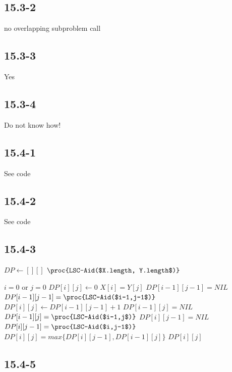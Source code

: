 \documentclass[]{article}
\begin{document}
\subsection{15.3-2}
no overlapping subproblem call

\subsection{15.3-3}
Yes

\subsection{15.3-4}
Do not know how!

\subsection{15.4-1}
See code

\subsection{15.4-2}
See code

\subsection{15.4-3}
\begin{codebox}
	\li $DP \leftarrow [][]$
	\li \Return $\proc{LSC-Aid($X.length, Y.length$)}$
	
\end{codebox}

\begin{codebox}
	\li \If $i = 0$ or $j = 0$ 
	\li \Then $DP[i][j] \leftarrow 0$
	\li \Else 
	\li \If $X[i] = Y[j]$
	\li \Then \If $DP[i-1][j-1] = NIL$
	\li \Then $DP[i-1][j-1] = \proc{LSC-Aid($i-1,j-1$)}$ \End
	\li $DP[i][j] \leftarrow DP[i-1][j-1] + 1$
	\li \Else 
	\li \If $DP[i-1][j] = NIL$
	\li \Then $DP[i-1][j] = \proc{LSC-Aid($i-1,j$)}$ \End
	\li \If $DP[i][j-1] = NIL$
	\li \Then $DP[i][j-1] = \proc{LSC-Aid($i,j-1$)}$ \End
	\li $DP[i][j] = max \{DP[i][j-1], DP[i-1][j]\}$ \End \End
	\li \Return $DP[i][j]$

	
\end{codebox}

\subsection{15.4-5}
\end{document}
